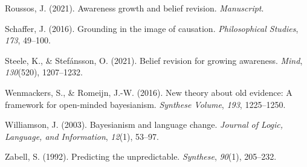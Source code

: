 \documentclass[
  11pt,
  dvipsnames,enabledeprecatedfontcommands]{scrartcl}
\newlength{\cslhangindent}
\newlength{\cslentryspacingunit} %
\newenvironment{CSLReferences}[2] %
 {%
  \setlength{\parindent}{0pt}
  \ifodd #1
  \let\oldpar\par
  \def\par{\hangindent=\cslhangindent\oldpar}
  \fi
  \setlength{\parskip}{#2\cslentryspacingunit}
 }%
 {}
\begin{document}
\begin{CSLReferences}{1}{0}
\leavevmode{}%
Roussos, J. (2021). Awareness growth and belief revision.
\emph{Manuscript}.

\leavevmode{}%
Schaffer, J. (2016). Grounding in the image of causation.
\emph{Philosophical Studies}, \emph{173}, 49--100.

\leavevmode{}%
Steele, K., \& Stefánsson, O. (2021). Belief revision for growing
awareness. \emph{Mind}, \emph{130}(520), 1207--1232.

\leavevmode{}%
Wenmackers, S., \& Romeijn, J.-W. (2016). New theory about old evidence:
A framework for open-minded bayesianism. \emph{Synthese Volume},
\emph{193}, 1225--1250.

\leavevmode{}%
Williamson, J. (2003). Bayesianism and language change. \emph{Journal of
Logic, Language, and Information}, \emph{12}(1), 53--97.

\leavevmode{}%
Zabell, S. (1992). Predicting the unpredictable. \emph{Synthese},
\emph{90}(1), 205--232.

\end{CSLReferences}
\end{document}

